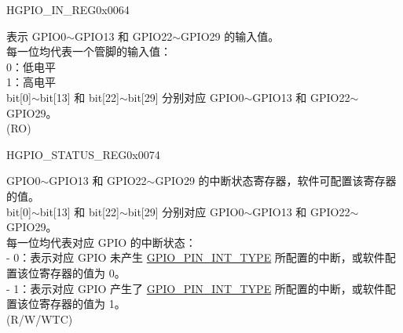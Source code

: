 \begin{register}{H}{GPIO\_IN\_REG}{0x0064}\label{regdesc:GPIOINREG}
%
\regnewline%
\begin{regdesc}\begin{reglist}
\label{fielddesc:GPIOINDATANEXT}\item [GPIO\_IN\_DATA\_NEXT] 表示 GPIO0$\sim$GPIO13 和 GPIO22$\sim$GPIO29 的输入值。\\
每一位均代表一个管脚的输入值：\\
0：低电平\\
1：高电平\\ 
bit[0]$\sim$bit[13] 和 bit[22]$\sim$bit[29] 分别对应 GPIO0$\sim$GPIO13 和 GPIO22$\sim$GPIO29。\\
(RO)
\end{reglist}\end{regdesc}
\end{register}


\begin{register}{H}{GPIO\_STATUS\_REG}{0x0074}\label{regdesc:GPIOSTATUSREG}
%
\regnewline%
\begin{regdesc}\begin{reglist}
\label{fielddesc:GPIOSTATUSINTERRUPT}\item [GPIO\_STATUS\_INTERRUPT] GPIO0$\sim$GPIO13 和 GPIO22$\sim$GPIO29 的中断状态寄存器，软件可配置该寄存器的值。\\
bit[0]$\sim$bit[13] 和 bit[22]$\sim$bit[29] 分别对应 GPIO0$\sim$GPIO13 和 GPIO22$\sim$GPIO29。\\
每一位均代表对应 GPIO 的中断状态：\\
    - 0：表示对应 GPIO 未产生 \hyperref[fielddesc:GPIOPINNINTTYPE]{GPIO\_PIN\_INT\_TYPE} 所配置的中断，或软件配置该位寄存器的值为 0。\\
    - 1：表示对应 GPIO 产生了 \hyperref[fielddesc:GPIOPINNINTTYPE]{GPIO\_PIN\_INT\_TYPE} 所配置的中断，或软件配置该位寄存器的值为 1。\\
 (R/W/WTC)
\end{reglist}\end{regdesc}
\end{register}


